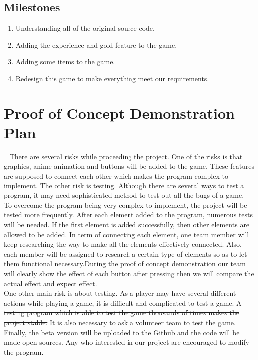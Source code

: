 \documentclass[12pt]{article}
\newcommand\tab[1][1cm]{\hspace*{#1}}
\begin{document}
\subsection*{Milestones}
\tab
\begin{enumerate}[label=(\roman*)]
\item Understanding all of the original source code.
\item Adding the experience and gold feature to the game.
\item Adding some items to the game.
\item Redesign this game to make everything meet our requirements.
\end{enumerate}
\newpage
\section{Proof of Concept Demonstration Plan}
~\newline
\tab There are several risks while proceeding the project. One of the risks is that graphics, \st{anime} {\color{red} animation} and buttons will be added to the game. These features are supposed to connect each other which makes the program complex to implement. The other risk is testing. Although there are several ways to test a program, it may need sophisticated method to test out all the bugs of a game.\\

\tab To overcome the program being very complex to implement, the project will be tested more frequently. After each element added to the program, numerous tests will be needed. If the first element is added successfully, then other elements are allowed to be added. In term of connecting each element, one team member will keep researching the way to make all the elements effectively connected. Also, each member will be assigned to research a certain type of elements so as to let them functional necessary.{\color{red}During the proof of concept demonstration our team will clearly show the effect of each button after pressing then we will compare the actual effect and expect effect. }\\

\tab One other main risk is about testing. As a player may have several different actions while playing a game, it is difficult and complicated to test a game. \st{A testing program which is able to test the game thousands of times makes the project stable.} It is also necessary to ask a volunteer team to test the game. Finally, the beta version will be uploaded to the Github and the code will be made open-sources. Any who interested in our project are encouraged to modify the program.\\
\end{document}
